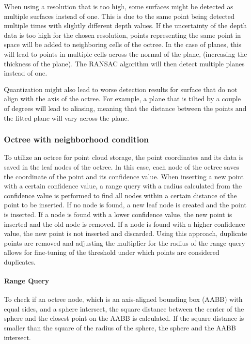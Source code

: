When using a resolution that is too high, some surfaces might be detected as multiple surfaces instead of one.
This is due to the same point being detected multiple times with slightly different depth values.
If the uncertainty of the depth data is too high for the chosen resolution,
points representing the same point in space will be added to neighboring cells of the octree.
In the case of planes, this will lead to points in multiple cells across the normal of the plane,
(increasing the thickness of the plane).
The RANSAC algorithm will then detect multiple planes instead of one.

Quantization might also lead to worse detection results for surface that do not align with the axis of the octree.
For example, a plane that is tilted by a couple of degrees will lead to aliasing,
meaning that the distance between the points and the fitted plane will vary across the plane.

\subsubsection{Octree with neighborhood condition}
To utilize an octree for point cloud storage, the point coordinates and its data is saved in the leaf nodes of the octree.
In this case, each node of the octree saves the coordinate of the point and its confidence value.
When inserting a new point with a certain confidence value, a range query with a radius calculated from the confidence value
is performed to find all nodes within a certain distance of the point to be inserted.
If no node is found, a new leaf node is created and the point is inserted.
If a node is found with a lower confidence value, the new point is inserted and the old node is removed.
If a node is found with a higher confidence value, the new point is not inserted and discarded.
Using this approach, duplicate points are removed and adjusting the multiplier for the radius of the range query
allows for fine-tuning of the threshold under which points are considered duplicates.

\paragraph{Range Query}
To check if an octree node, which is an axis-aligned bounding box (AABB) with equal sides, and a sphere intersect,
the square distance between the center of the sphere and the closest point on the AABB is calculated.
If the square distance is smaller than the square of the radius of the sphere, the sphere and the AABB intersect.

